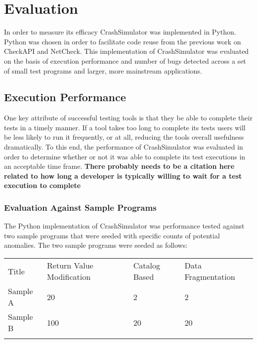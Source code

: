 \section{Evaluation}

    In order to measure its efficacy CrashSimulator was implemented in Python. Python was chosen in order to facilitate
    code reuse from the previous work on CheckAPI and NetCheck. This implementation of CrashSimulator was evaluated on
    the basis of execution performance and number of bugs detected across a set of small test programs and larger, more
    mainstream applications.



    \subsection{Execution Performance}

        One key attribute of successful testing tools is that they be able to complete their tests in a timely manner.
        If a tool takes too long to complete its tests users will be less likely to run it frequently, or at all,
        reducing the tools overall usefulness dramatically. To this end, the performance of CrashSimulator was evaluated
        in order to determine whether or not it was able to complete its test executions in an acceptable time frame.
        \textbf{There probably needs to be a citation here related to how long a developer is typically willing to wait
        for a test execution to complete}

        \subsubsection{Evaluation Against Sample Programs}

            The Python implementation of CrashSimulator was performance
            tested against two sample programs that were seeded with specific counts of potential anomalies. The two sample
            programs were seeded as follows:

            \begin{tabular}{l  l  l  l}
                \toprule{}
                    Title & Return Value Modification & Catalog Based & Data Fragmentation \\
                    Sample A & 20 & 2 & 2 \\
                    Sample B & 100 & 20 & 20 \\
                \bottomrule{}
            \end{tabular}

